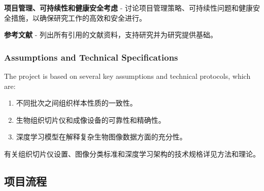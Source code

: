 \textbf{项目管理、可持续性和健康安全考虑} - 讨论项目管理策略、可持续性问题和健康安全措施，以确保研究工作的高效和安全进行。

\textbf{参考文献} - 列出所有引用的文献资料，支持研究并为研究提供基础。

\subsubsection{Assumptions and Technical Specifications}

The project is based on several key assumptions and technical protocols, which are:


\begin{enumerate}
    \item 不同批次之间组织样本性质的一致性。
    \item 生物组织切片仪和成像设备的可靠性和精确性。
    \item 深度学习模型在解释复杂生物图像数据方面的充分性。
\end{enumerate}
有关组织切片仪设置、图像分类标准和深度学习架构的技术规格详见方法和理论。

\subsection{项目流程}

